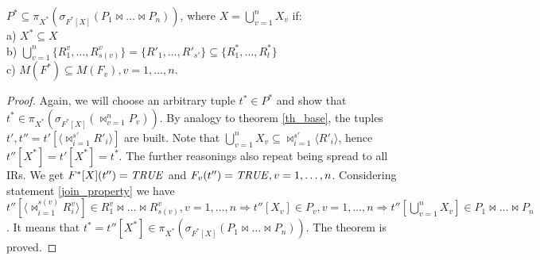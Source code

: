 \def \bigcupn {\bigcup\limits_{v=1}^{n}}
\begin{theorem}
$P^{\ast} \subseteq \pi_{X^{\ast}} ( \sigma_{F^{\ast}[X]} (P_1 \Join \dots \Join P_n))$, where $X = \bigcupn X_{v}$ if:
\\a) $X^{\ast} \subseteq X$
\\b)
$ \bigcupn \{R^{v}_{1}, \ldots, R^{v}_{s(v)}\} = \{R'_{1}, \ldots, R'_{s'}\}
\subseteq
\{R^{\ast}_{1}, \ldots, R^{\ast}_{l}\} $
\\c) $M(F^{\ast}) \subseteq M(F_{v}), v = 1,\dots,n $.

\label{th_mult}
\end{theorem}
\begin{proof}
Again, we will choose an arbitrary tuple $t^{\ast} \in P^{\ast}$
and show that $t^{\ast} \in \pi_{X^{\ast}} ( \sigma_{F^{\ast}[X]}
(\Join_{v=1}^{n} P_{v}))$. By analogy to theorem \ref{th_base}, the tuples $t',
t'' = t'[\langle {\Join}_{i=1}^{s'} R'_i \rangle]$ are built.
Note that  $\bigcupn X_{v} \subseteq {\Join}_{i=1}^{s'} \langle R'_i \rangle$, hence
$t''[X^{\ast}] = t'[X^{\ast}] = t^{\ast}$.
The further reasonings also repeat being spread to all IRs.
We get $F^{\ast} [X] (t'') = \mathit{TRUE}$ and $F_v (t'') = \mathit{TRUE}, v = 1,\dots,n $.
Considering statement \ref{join_property} we have $t''[\langle \Join_{i=1}^{s(v)} R^v_i \rangle]
\in 
R^v_1 \Join \dots \Join R^v_{s(v)}, v = 1, \dots, n
\Rightarrow   
t''[X_v] \in P_v, v = 1, \dots, n
\Rightarrow
t''[\bigcupn X_{v}] \in P_1 \Join \dots \Join P_n$.
It means that $t^{\ast} = t''[X^{\ast}] \in 
\pi_{X^{\ast}} ( \sigma_{F^{\ast}[X]} (P_1 \Join \dots \Join P_n))$.
The theorem is proved.
\end{proof}
